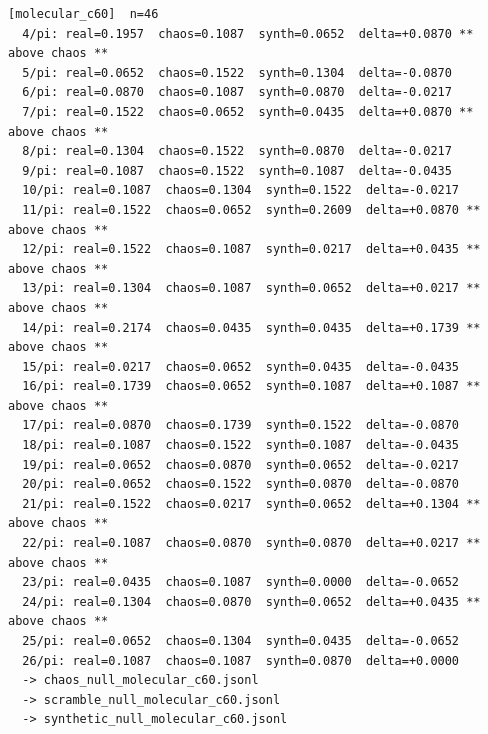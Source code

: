 \documentclass[11pt, letterpaper, openany]{book}
\begin{document}
\begin{empiricalbox}
\begin{lstlisting}[style=terminal]
[molecular_c60]  n=46
  4/pi: real=0.1957  chaos=0.1087  synth=0.0652  delta=+0.0870 ** above chaos **
  5/pi: real=0.0652  chaos=0.1522  synth=0.1304  delta=-0.0870
  6/pi: real=0.0870  chaos=0.1087  synth=0.0870  delta=-0.0217
  7/pi: real=0.1522  chaos=0.0652  synth=0.0435  delta=+0.0870 ** above chaos **
  8/pi: real=0.1304  chaos=0.1522  synth=0.0870  delta=-0.0217
  9/pi: real=0.1087  chaos=0.1522  synth=0.1087  delta=-0.0435
  10/pi: real=0.1087  chaos=0.1304  synth=0.1522  delta=-0.0217
  11/pi: real=0.1522  chaos=0.0652  synth=0.2609  delta=+0.0870 ** above chaos **
  12/pi: real=0.1522  chaos=0.1087  synth=0.0217  delta=+0.0435 ** above chaos **
  13/pi: real=0.1304  chaos=0.1087  synth=0.0652  delta=+0.0217 ** above chaos **
  14/pi: real=0.2174  chaos=0.0435  synth=0.0435  delta=+0.1739 ** above chaos **
  15/pi: real=0.0217  chaos=0.0652  synth=0.0435  delta=-0.0435
  16/pi: real=0.1739  chaos=0.0652  synth=0.1087  delta=+0.1087 ** above chaos **
  17/pi: real=0.0870  chaos=0.1739  synth=0.1522  delta=-0.0870
  18/pi: real=0.1087  chaos=0.1522  synth=0.1087  delta=-0.0435
  19/pi: real=0.0652  chaos=0.0870  synth=0.0652  delta=-0.0217
  20/pi: real=0.0652  chaos=0.1522  synth=0.0870  delta=-0.0870
  21/pi: real=0.1522  chaos=0.0217  synth=0.0652  delta=+0.1304 ** above chaos **
  22/pi: real=0.1087  chaos=0.0870  synth=0.0870  delta=+0.0217 ** above chaos **
  23/pi: real=0.0435  chaos=0.1087  synth=0.0000  delta=-0.0652
  24/pi: real=0.1304  chaos=0.0870  synth=0.0652  delta=+0.0435 ** above chaos **
  25/pi: real=0.0652  chaos=0.1304  synth=0.0435  delta=-0.0652
  26/pi: real=0.1087  chaos=0.1087  synth=0.0870  delta=+0.0000
  -> chaos_null_molecular_c60.jsonl
  -> scramble_null_molecular_c60.jsonl
  -> synthetic_null_molecular_c60.jsonl


\end{lstlisting}
\end{empiricalbox}
\end{document}

